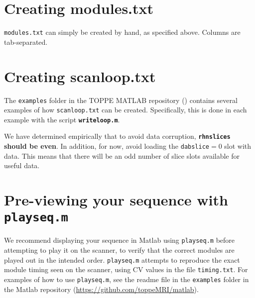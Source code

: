 \section{Creating modules.txt}
{\tt modules.txt} can simply be created by hand, as specified above.
Columns are tab-separated.


\section{Creating scanloop.txt}
The {\tt examples} folder in the TOPPE MATLAB repository (\matrep) contains several examples of how {\tt scanloop.txt} can be created.
Specifically, this is done in each example with the script {\tt \bf writeloop.m}.

We have determined empirically that to avoid data corruption, {\bf{\tt rhnslices} should be even}.
In addition, for now, avoid loading the {\tt dabslice}$=0$ slot with data. 
This means that there will be an odd number of slice slots available for useful data.


\section{Pre-viewing your sequence with {\tt playseq.m} }

We recommend displaying your sequence in Matlab using \texttt{playseq.m} before attempting to play it on the scanner, to verify that the correct modules are played out in the intended order.
\texttt{playseq.m} attempts to reproduce the exact module timing seen on the scanner, using CV values in the file \texttt{timing.txt}.
For examples of how to use \texttt{playseq.m}, see the readme file in the {\tt examples} folder in the Matlab repository (\url{https://github.com/toppeMRI/matlab}).





